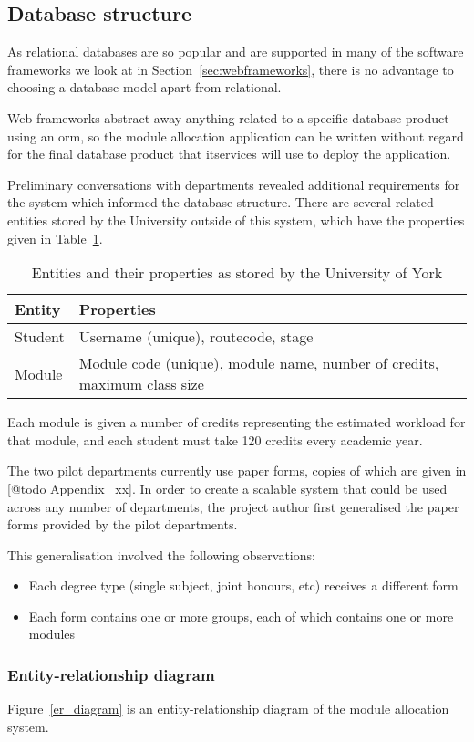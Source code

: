 
\subsection{Database structure}

As relational databases are so popular and are supported in many of the
software frameworks we look at in Section~\ref{sec:webframeworks}, there is no
advantage to choosing a database model apart from relational.

Web frameworks abstract away anything related to a specific database product
using an \gls{orm}, so the module allocation application can be written
without regard for the final database product that \gls{itservices} will use
to deploy the application.

Preliminary conversations with departments revealed additional requirements
for the system which informed the database structure. There are several
related entities stored by the University outside of this system, which have
the properties given in Table~\ref{development_database_uni_entities}.

\begin{table}
  \begin{tabular}{ | l | l | }
    \hline
    \textbf{Entity} & \textbf{Properties} \\
    \hline
    Student    & Username (unique), \gls{routecode}, \gls{stage} \\
    Module     & Module code (unique), module name, number of credits, maximum class size \\
    \hline
  \end{tabular}
  \caption{Entities and their properties as stored by the University of York}
  \label{development_database_uni_entities}
\end{table}

Each module is given a number of credits representing the estimated workload
for that module, and each student must take 120 credits every academic year.

The two pilot departments currently use paper forms, copies of which are given
in [@todo Appendix~ xx]. In order to create a scalable system that could be
used across any number of departments, the project author first generalised
the paper forms provided by the pilot departments.

This generalisation involved the following observations:

\begin{itemize}
  \item Each degree type (single subject, joint honours, etc) receives a different form
  \item Each form contains one or more groups, each of which contains one or more modules
\end{itemize}

\subsubsection{Entity-relationship diagram}

Figure~\ref{er_diagram} is an entity-relationship diagram of the module
allocation system.



